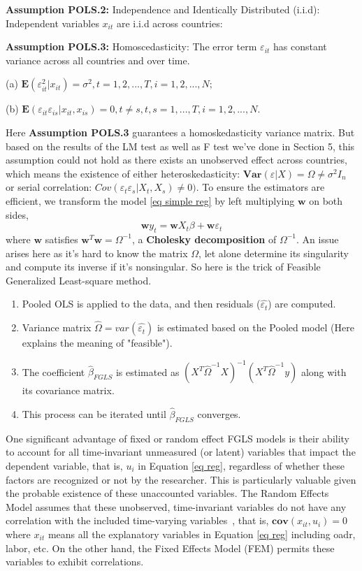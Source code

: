 \documentclass[ %
    final,
    scrbook,
    listoffigures,
    listoftables, 
    glossary]{cu-thesis}
\begin{document}
\noindent \textbf{Assumption POLS.2:} Independence and Identically Distributed (i.i.d): Independent variables $x_{it}$ are i.i.d across countries: 
\iffalse $\textbf{rank} [\sum_{t=1}^{T}\textbf{E}(X^{T}_{t} X_t)]=6,  t = 1,2, ..., T.$ \fi

\noindent \textbf{Assumption POLS.3:} Homoscedasticity: The error term $\varepsilon_{it}$ has constant variance across all countries and over time.

(a) $\textbf{E}(\varepsilon_{it}^{2}|x_{it})=\sigma^2,  t = 1,2, ..., T, i = 1,2,..., N;$

(b) $\textbf{E}(\varepsilon_{it}\varepsilon_{is}|x_{it}, x_{is})=0, t\neq s, t, s = 1,..., T, i = 1,2,..., N.$

\noindent Here \textbf{Assumption POLS.3} guarantees a homoskedasticity variance matrix. 
But based on the results of the LM test as well as F test we've done in Section 5, this assumption could not hold as there exists an unobserved effect across countries, which means the existence of either heteroskedasticity: $\textbf{Var}(\varepsilon|X)=\Omega \neq \sigma^{2}I_n$ or serial correlation: $Cov(\varepsilon_{t}\varepsilon_{s}|X_{t}, X_{s})\neq 0)$.
To ensure the estimators are efficient, we transform the model \ref{eq simple reg} by left multiplying $\textbf{w}$ on both sides, 
$$\textbf{w}y_{t} = \textbf{w}X_t\beta+\textbf{w}\varepsilon_{t}$$ where $
\textbf{w}$ satisfies $\textbf{w}^{T}\textbf{w}=\Omega^{-1}$, a \textbf{Cholesky decomposition} of $\Omega^{-1}$. An issue arises here as it's hard to know the matrix $\Omega$, let alone determine its singularity and compute its inverse if it's nonsingular. So here is the trick of Feasible Generalized Least-square method. 
\begin{enumerate}
  \item Pooled OLS is applied to the data, and then residuals ($\hat{\varepsilon_t}$) are computed.
  \item Variance matrix $\hat{\Omega}=var(\hat{\varepsilon_t})$ is estimated based on the Pooled model (Here explains the meaning of "feasible").
  \item The coefficient $\hat{\beta}_{FGLS}$ is estimated as $(X^{T}\hat{\Omega}^{-1}X)^{-1}(X^{T}\hat{\Omega}^{-1}y)$ along with its covariance matrix.
  \item This process can be iterated until $\hat{\beta}_{FGLS}$ converges.
\end{enumerate}

One significant advantage of fixed or random effect FGLS models is their ability to account for all time-invariant unmeasured (or latent) variables that impact the dependent variable, that is, $u_i$ in Equation \ref{eq reg}, regardless of whether these factors are recognized or not by the researcher. This is particularly valuable given the probable existence of these unaccounted variables. The Random Effects Model assumes that these unobserved, time-invariant variables do not have any correlation with the included time-varying variables~\cite{wooldridge2010econometric}, that is, $\textbf{cov}(x_{it}, u_i)=0$ where $x_{it}$ means all the explanatory variables in Equation \ref{eq reg} including oadr, labor, etc. On the other hand, the Fixed Effects Model (FEM) permits these variables to exhibit correlations.
\end{document}
